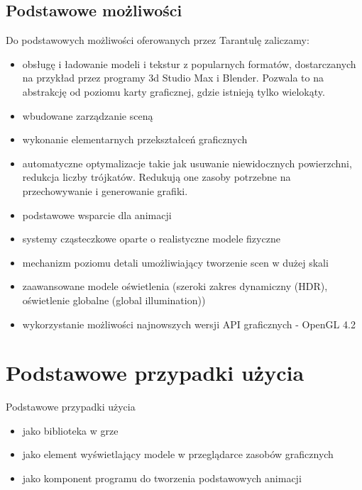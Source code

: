 \documentclass[11pt,leqno]{article}
\begin{document}
\subsection{Podstawowe możliwości}
\noindent
Do podstawowych możliwości oferowanych przez Tarantulę zaliczamy:
\begin{itemize}
 \item obsługę i ładowanie modeli i tekstur z popularnych formatów, dostarczanych na przykład przez programy 3d Studio Max i Blender. 
 Pozwala to na abstrakcję od poziomu karty graficznej, gdzie istnieją tylko wielokąty.
  \item wbudowane zarządzanie sceną
\item wykonanie elementarnych przekształceń graficznych
\item automatyczne optymalizacje takie jak usuwanie niewidocznych powierzchni, redukcja liczby trójkatów. Redukują one zasoby potrzebne na przechowywanie i generowanie grafiki.
\item podstawowe wsparcie dla animacji
\item systemy cząsteczkowe oparte o realistyczne modele fizyczne
\item mechanizm poziomu detali umożliwiający tworzenie scen w dużej skali
\item zaawansowane modele oświetlenia (szeroki zakres dynamiczny (HDR), oświetlenie globalne (global illumination))
\item wykorzystanie możliwości najnowszych wersji API graficznych  - OpenGL 4.2
\end{itemize}


\section{Podstawowe przypadki użycia}
Podstawowe przypadki użycia
\begin{itemize}
\item jako biblioteka w grze
\item jako element wyświetlający modele w przeglądarce zasobów graficznych
\item jako komponent programu do tworzenia podstawowych animacji
\end{itemize}
\end{document}
